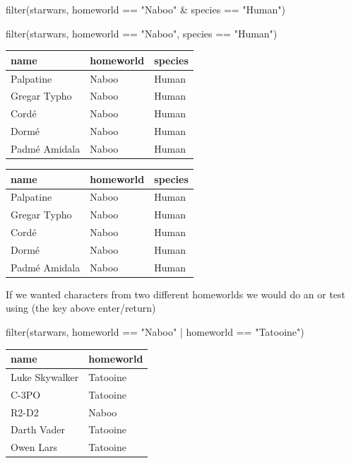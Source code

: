 \documentclass[
  letterpaper,
  DIV=11,
  numbers=noendperiod,
  oneside]{scrreprt}
\newenvironment{Shaded}{\begin{snugshade}}{\end{snugshade}}
\newcommand{\FunctionTok}[1]{\textcolor[rgb]{0.28,0.35,0.67}{#1}}
\newcommand{\NormalTok}[1]{\textcolor[rgb]{0.00,0.23,0.31}{#1}}
\newcommand{\SpecialCharTok}[1]{\textcolor[rgb]{0.37,0.37,0.37}{#1}}
\newcommand{\StringTok}[1]{\textcolor[rgb]{0.13,0.47,0.30}{#1}}
\begin{document}
\begin{Shaded}
\begin{Highlighting}[]
\FunctionTok{filter}\NormalTok{(starwars, homeworld }\SpecialCharTok{==} \StringTok{"Naboo"} \SpecialCharTok{\&}\NormalTok{ species }\SpecialCharTok{==} \StringTok{"Human"}\NormalTok{) }

\FunctionTok{filter}\NormalTok{(starwars, homeworld }\SpecialCharTok{==} \StringTok{"Naboo"}\NormalTok{, species }\SpecialCharTok{==} \StringTok{"Human"}\NormalTok{)}
\end{Highlighting}
\end{Shaded}

\begin{tabular}{l|l|l}
\hline
name & homeworld & species\\
\hline
Palpatine & Naboo & Human\\
\hline
Gregar Typho & Naboo & Human\\
\hline
Cordé & Naboo & Human\\
\hline
Dormé & Naboo & Human\\
\hline
Padmé Amidala & Naboo & Human\\
\hline
\end{tabular}

\begin{tabular}{l|l|l}
\hline
name & homeworld & species\\
\hline
Palpatine & Naboo & Human\\
\hline
Gregar Typho & Naboo & Human\\
\hline
Cordé & Naboo & Human\\
\hline
Dormé & Naboo & Human\\
\hline
Padmé Amidala & Naboo & Human\\
\hline
\end{tabular}

If we wanted characters from two different homeworlds we would do an or
test using \texttt{\textbar{}} (the key above enter/return)

\begin{Shaded}
\begin{Highlighting}[]
\FunctionTok{filter}\NormalTok{(starwars, homeworld }\SpecialCharTok{==} \StringTok{"Naboo"} \SpecialCharTok{|}\NormalTok{ homeworld }\SpecialCharTok{==} \StringTok{"Tatooine"}\NormalTok{)}
\end{Highlighting}
\end{Shaded}

\begin{tabular}{l|l}
\hline
name & homeworld\\
\hline
Luke Skywalker & Tatooine\\
\hline
C-3PO & Tatooine\\
\hline
R2-D2 & Naboo\\
\hline
Darth Vader & Tatooine\\
\hline
Owen Lars & Tatooine\\
\hline
\end{tabular}
\end{document}

